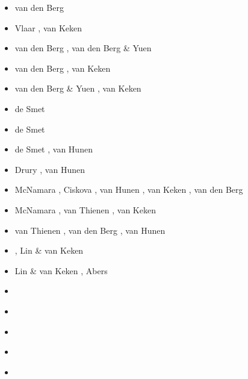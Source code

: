 \begin{itemize}
\begin{scriptsize}
\begin{itemize}
\item[\nineteenninetythree] van den Berg \etal \cite{beky93,vavy93}
\item[\nineteenninetyfour] Vlaar \etal \cite{vlvv94}, van Keken \etal \cite{vayv94}
\item[\nineteenninetyfive] van den Berg \etal \cite{vayv95}, van den Berg \& Yuen \cite{vayu95}
\item[\nineteenninetysix] van den Berg \etal \cite{vayu96}, van Keken \etal \cite{vaky96}
\item[\nineteenninetyseven] van den Berg \& Yuen \cite{vayu97}, van Keken \cite{vank97}
\item[\nineteenninetyeight] de Smet \etal \cite{devv98}
\item[\nineteenninetynine] de Smet \etal \cite{devv99}
\item[\twothousand] de Smet \etal \cite{devv00b}, van Hunen \etal \cite{vavv00}
\item[\twothousandone] Drury \etal \cite{drvc01}, van Hunen \etal \cite{vavv01}
\item[\twothousandtwo] McNamara \etal \cite{mcvk02}, Ciskova \etal \cite{civv02},
                       van Hunen \etal \cite{vavv02,vavv02b}, van Keken \etal \cite{vakp02},
                       van den Berg \etal \cite{vaya02}
\item[\twothousandthree] McNamara \etal \cite{mcvk03}, van Thienen \etal \cite{vavd03},
                         van Keken \etal \cite{vabh03}
\item[\twothousandfour] van Thienen \etal \cite{vavv04,vavv04b,vavv04c}, van den Berg \etal \cite{vayr04},
                        van Hunen \etal \cite{vavv04d}
\item[\twothousandfive] \cite{vavv05}\cite{sepr05}\cite{vary05}, Lin \& van Keken \cite{liva05}
\item[\twothousandsix] Lin \& van Keken \cite{liva06a,liva06b}, Abers \etal \cite{abvk06}
\item[\twothousandseven] \cite{vant07}\cite{civv07}\cite{brva07a}\cite{brva07b}\cite{knvk07}
\item[\twothousandeight] \cite{plva08}\cite{brhv08}\cite{knva08}\cite{vava08}
\item[\twothousandnine] \cite{vavl09}\cite{vavv09}
\item[\twothousandten] \cite{vahy10}\cite{syva10}\cite{devv10}\cite{vady10}\cite{vayb10}
\item[\twothousandeleven] \cite{vahs11}\cite{java11}\cite{vayj11}

\end{itemize}
\end{scriptsize}
\end{itemize}
